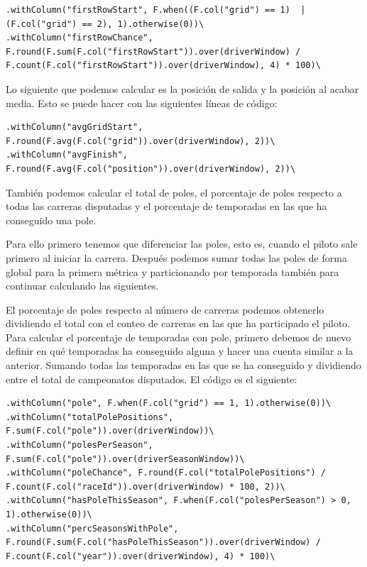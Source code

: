 \documentclass[12pt,twoside,titlepage]{report}
\begin{document}
\begin{lstlisting}
.withColumn("firstRowStart", F.when((F.col("grid") == 1)  | (F.col("grid") == 2), 1).otherwise(0))\
.withColumn("firstRowChance", F.round(F.sum(F.col("firstRowStart")).over(driverWindow) / F.count(F.col("firstRowStart")).over(driverWindow), 4) * 100)\
\end{lstlisting}

Lo siguiente que podemos calcular es la posición de salida y la posición al acabar media. Esto se puede hacer con las siguientes líneas de código:

\begin{lstlisting}
.withColumn("avgGridStart", F.round(F.avg(F.col("grid")).over(driverWindow), 2))\
.withColumn("avgFinish", F.round(F.avg(F.col("position")).over(driverWindow), 2))\
\end{lstlisting}

También podemos calcular el total de poles, el porcentaje de poles respecto a todas las carreras disputadas y el porcentaje de temporadas en las que ha conseguido una pole.

Para ello primero tenemos que diferenciar las poles, esto es, cuando el piloto sale primero al iniciar la carrera. Después podemos sumar todas las poles de forma global para la primera métrica y particionando por temporada también para continuar calculando las siguientes.

El porcentaje de poles respecto al número de carreras podemos obtenerlo dividiendo el total con el conteo de carreras en las que ha participado el piloto. Para calcular el porcentaje de temporadas con pole, primero debemos de nuevo definir en qué temporadas ha conseguido alguna y hacer una cuenta similar a la anterior. Sumando todas las temporadas en las que se ha conseguido y dividiendo entre el total de campeonatos disputados. El código es el siguiente:

\begin{lstlisting}
.withColumn("pole", F.when(F.col("grid") == 1, 1).otherwise(0))\
.withColumn("totalPolePositions", F.sum(F.col("pole")).over(driverWindow))\
.withColumn("polesPerSeason", F.sum(F.col("pole")).over(driverSeasonWindow))\
.withColumn("poleChance", F.round(F.col("totalPolePositions") / F.count(F.col("raceId")).over(driverWindow) * 100, 2))\
.withColumn("hasPoleThisSeason", F.when(F.col("polesPerSeason") > 0, 1).otherwise(0))\
.withColumn("percSeasonsWithPole", F.round(F.sum(F.col("hasPoleThisSeason")).over(driverWindow) / F.count(F.col("year")).over(driverWindow), 4) * 100)\
\end{lstlisting}
\end{document}
